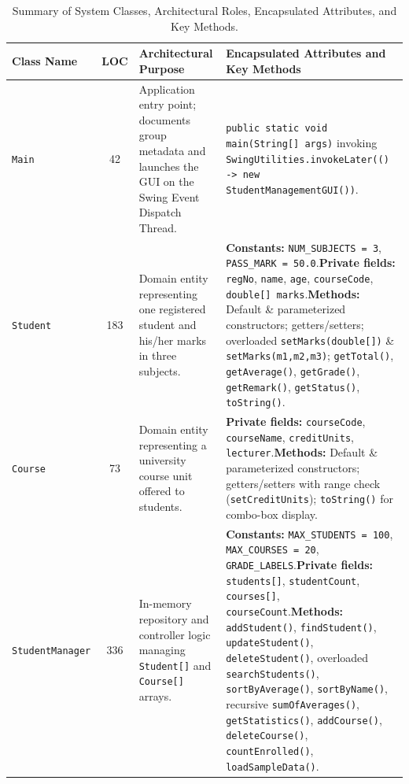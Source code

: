 \documentclass[10pt,a4paper]{article}
\begin{document}
\begin{table}[H]
\centering
\caption{Summary of System Classes, Architectural Roles, Encapsulated Attributes, and Key Methods.}
\label{tab:classes}
\footnotesize
\renewcommand{\arraystretch}{1.04}
\setlength{\tabcolsep}{4.5pt}
\begin{tabular}{@{}p{3.1cm} c p{4.4cm} p{8.8cm}@{}}
\toprule
\textbf{Class Name} & \textbf{LOC} & \textbf{Architectural Purpose} & \textbf{Encapsulated Attributes and Key Methods} \\
\midrule
\texttt{Main} & 42 & Application entry point; documents group metadata and launches the GUI on the Swing Event Dispatch Thread. & \texttt{public static void main(String[] args)} invoking \texttt{SwingUtilities.invokeLater(() -> new StudentManagementGUI())}. \\
\addlinespace[1pt]
\texttt{Student} & 183 & Domain entity representing one registered student and his/her marks in three subjects. & \textbf{Constants:} \texttt{NUM\_SUBJECTS = 3}, \texttt{PASS\_MARK = 50.0}.\newline \textbf{Private fields:} \texttt{regNo}, \texttt{name}, \texttt{age}, \texttt{courseCode}, \texttt{double[] marks}.\newline \textbf{Methods:} Default \& parameterized constructors; getters/setters; overloaded \texttt{setMarks(double[])} \& \texttt{setMarks(m1,m2,m3)}; \texttt{getTotal()}, \texttt{getAverage()}, \texttt{getGrade()}, \texttt{getRemark()}, \texttt{getStatus()}, \texttt{toString()}. \\
\addlinespace[1pt]
\texttt{Course} & 73 & Domain entity representing a university course unit offered to students. & \textbf{Private fields:} \texttt{courseCode}, \texttt{courseName}, \texttt{creditUnits}, \texttt{lecturer}.\newline \textbf{Methods:} Default \& parameterized constructors; getters/setters with range check (\texttt{setCreditUnits}); \texttt{toString()} for combo-box display. \\
\addlinespace[1pt]
\texttt{StudentManager} & 336 & In-memory repository and controller logic managing \texttt{Student[]} and \texttt{Course[]} arrays. & \textbf{Constants:} \texttt{MAX\_STUDENTS = 100}, \texttt{MAX\_COURSES = 20}, \texttt{GRADE\_LABELS}.\newline \textbf{Private fields:} \texttt{students[]}, \texttt{studentCount}, \texttt{courses[]}, \texttt{courseCount}.\newline \textbf{Methods:} \texttt{addStudent()}, \texttt{findStudent()}, \texttt{updateStudent()}, \texttt{deleteStudent()}, overloaded \texttt{searchStudents()}, \texttt{sortByAverage()}, \texttt{sortByName()}, recursive \texttt{sumOfAverages()}, \texttt{getStatistics()}, \texttt{addCourse()}, \texttt{deleteCourse()}, \texttt{countEnrolled()}, \texttt{loadSampleData()}. \\

\end{tabular}
\end{table}
\end{document}
